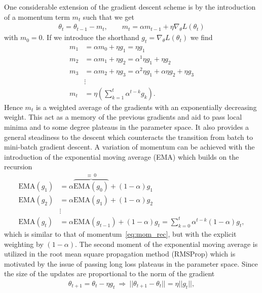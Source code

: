 One considerable extension of the gradient descent scheme is by the introduction of a momentum term $m_t$ such that we get
\begin{align}
  \theta_t = \theta_{t-1} - m_t, \qquad m_t = \alpha m_{t-1} + \eta \nabla_\theta L(\theta_t)
  \label{eq:mom}
\end{align}
with $m_0 = 0$. If we introduce the shorthand $g_t = \nabla_\theta L(\theta_t)$ we find
\begin{align}
  m_1 &= \alpha m_0 + \eta g_1 = \eta g_1 \nonumber \\
  m_2 &= \alpha m_1 + \eta g_2 = \alpha^1 \eta g_1 + \eta g_2 \nonumber \\
  m_3 &= \alpha m_2 + \eta g_3 = \alpha^2 \eta g_1 + \alpha\eta g_2 + \eta g_3 \nonumber \\
  &\vdots \nonumber \\
  m_t &= \eta \left(\sum_{k=1}^{t} \alpha^{t-k}g_k\right).
  \label{eq:mom_rec}
\end{align}
Hence $m_t$ is a weighted average of the gradients with an exponentially decreasing weight. This act as a memory of the previous gradients and aid to pass local minima and to some degree plateaus in the parameter space. It also provides a general steadiness to the descent which counteracts the transition from batch to mini-batch gradient descent. A variation of momentum can be achieved with the introduction of the exponential moving average (EMA) which builds on the recursion
\begin{align*}
    \text{EMA}(g_1) &= \alpha \overbrace{\text{EMA}(g_0)}^{\equiv \ 0} + (1-\alpha)g_1 \\
    \text{EMA}(g_2) &= \alpha \text{EMA}(g_1) + (1-\alpha)g_2 \\
    &\vdots \\
    \text{EMA}(g_t) &= \alpha \text{EMA}(g_{t-1}) + (1-\alpha)g_t  = \sum_{k=0}^t \alpha^{t-k}(1-\alpha)g_t,
\end{align*}
which is similar to that of momentum~\cref{eq:mom_rec}, but with the explicit weighting by $(1-\alpha)$. The second moment of the exponential moving average is utilized in the root mean square propagation method (\acrshort{RMSProp}) which is motivated by the issue of passing long loss plateaus in the parameter space. Since the size of the updates are proportional to the norm of the gradient
\begin{align*}
  \theta_{t+1} = \theta_t - \eta g_t \ \Longrightarrow \ ||\theta_{t+1}-\theta_{t}|| = \eta ||g_t||,
\end{align*}
